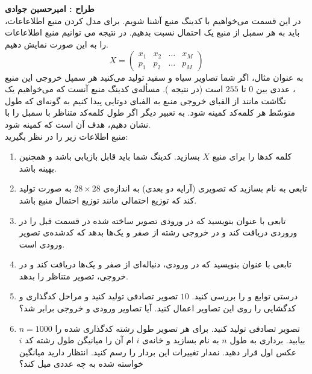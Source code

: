 \documentclass[a4]{article}
\begin{document}
\section{}
\textbf{طراح :‌ امیرحسین جوادی}
\vspace{0.5cm}
\\
در این قسمت می‌خواهیم با کدینگ منبع
 آشنا شویم. برای مدل کردن منبع اطلاعاعات، باید به هر سمبل از منبع یک احتمال نسبت بدهیم. در نتیجه می توانیم منبع اطلاعاعات را به این صورت نمایش دهیم.
 \[X = \begin{pmatrix}
 	x_1 & x_2 & \dots & x_M\\
 	p_1 & p_2 & \dots & p_M
 \end{pmatrix}\]
 به عنوان مثال، اگر شما تصاویر سیاه و سفید تولید می‌کنید هر سمپل خروجی این منبع ، عددی بین $ 0 $ تا $ 255 $ است (در نتیجه 
 ).
 مسأله‌ی کدینگ منبع آنست که می‌خواهیم یک نگاشت مانند
 از الفبای خروجی منبع به الفبای دوتایی
 پیدا کنیم به گونه‌ای که طول متوسّط هر کلمه‌کد کمینه شود. به تعبیر دیگر اگر طول کلمه‌کد متناظر با سمبل
 را با
 نشان دهیم، هدف آن است که
 کمینه شود. 
 \\
 منبع اطلاعات زیر را در نظر بگیرید:
\lr{\[X = \begin{pmatrix}
		I_{x}=0 & I_{x}=50 & I_{x}=100 & I_{x}=150 & I_{x}=200 & I_{x}=250 & \text{otherwise}\\
		\frac{1}{2} & \frac{1}{32} & \frac{1}{8} & \frac{1}{16}& \frac{1}{32}& \frac{1}{4} & 0
	\end{pmatrix}\]}
\begin{enumerate}
	\item 
 کلمه کدها را برای منبع  $ X $ بسازید. کدینگ شما باید قابل بازیابی باشد و همچنین بهینه باشد. 
 	\item 
 	تابعی به نام 
 	بسازید که تصویری (آرایه دو بعدی) به اندازه‌ی
 	 $ 28 \times 28 $
 	 به صورت 
 	 تولید کند که توزیع احتمالی مانند توزیع احتمال منبع
 	 باشد.
 	 \item
 	 تابعی با عنوان
 	 بنویسید که در ورودی تصویر ساخته شده در قسمت قبل را در وروردی دریافت کند و در خروجی رشته از صفر و یک‌ها بدهد که کدشده‌ی تصویر ورودی است.
 	 \item 
 	 تابعی با عنوان
 	 بنویسید که در ورودی، دنباله‌ای از صفر و یک‌ها دریافت کند و در خروجی، تصویر متناظر را بدهد.   
 	 \item 
 	 درستی توابع
 	 و 
 	 را بررسی کنید. $ 10 $ تصویر تصادفی تولید کنید و مراحل کدگذاری و کدگشایی را روی این تصاویر اعمال کنید. آیا تصاویر ورودی و خروجی برابر شد؟ 
 	 \item 
 	 $ n = 1000 $ 
 	 تصویر تصادفی تولید کنید. برای هر تصویر طول رشته کدگذاری شده را بیابید. بردار‌ی به طول $ n $ به نام 
بسازید و خانه‌ی‌ $ i $ ام آن را میانیگن طول رشته کد $ i $ عکس اول قرار دهید. نمدار تغییرات این بردار را رسم کنید. انتظار دارید میانگین خواسته شده به چه عددی میل کند؟ 
\end{enumerate}
\end{document}
